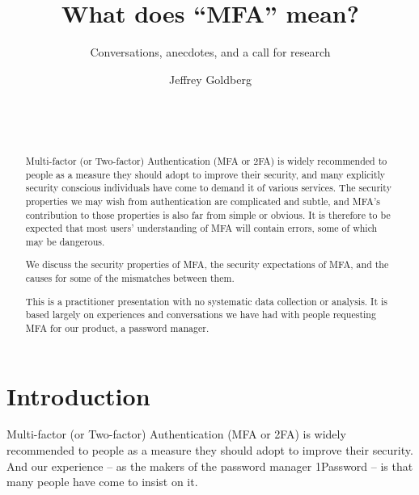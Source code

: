 \documentclass{soups}
\begin{document}
%


\title{What does ``MFA'' mean?}
\subtitle{Conversations, anecdotes, and a call for research}

\author{
  \alignauthor
  Jeffrey Goldberg\\
       \\
       \\
       \\
}


\maketitle
\begin{abstract}

Multi-factor (or Two-factor) Authentication (MFA or 2FA) is widely recommended to people as a measure they should adopt to improve their security,
and many explicitly security conscious individuals have come to demand it of various services.
The security properties we may wish from authentication are complicated and subtle,
and MFA's contribution to those properties is also far from simple or obvious.
It is therefore to be expected that most users' understanding of MFA will contain errors, some of which may be dangerous.

We discuss the security properties of MFA, the security expectations of MFA, and the causes for some of the mismatches between them.

This is a practitioner presentation with no systematic data collection or analysis.
It is based largely on experiences and conversations we have had with people requesting MFA for our product, a password manager.
\end{abstract}


\section{Introduction}
Multi-factor (or Two-factor) Authentication (MFA or 2FA) is widely recommended to people as a measure they should adopt to improve their security. And our experience -- as the makers of the password manager 1Password -- is that many people have come to insist on it.
\end{document}
